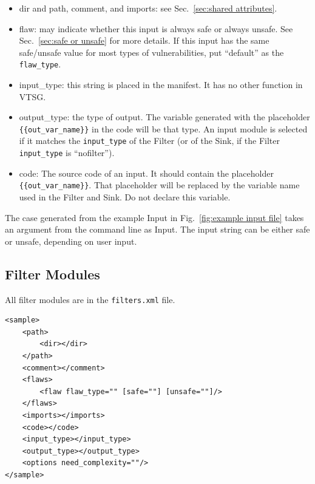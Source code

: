 \begin{itemize}
    \item dir and path, comment, and imports: see Sec.~\ref{sec:shared attributes}.

    \item flaw: may indicate whether this input is always safe or always unsafe.
      See Sec.~\ref{sec:safe or unsafe} for
      more details.  If this input has the same safe/unsafe value for most
      types of vulnerabilities, put ``default'' as the \verb|flaw_type|.

    \item input\_type: this string is placed in the manifest.  It has no other
      function in VTSG.

    \item output\_type: the type of output.  The variable generated with the
      placeholder \\ \verb|{{out_var_name}}| in the code will be that type.
      An input module is selected if it matches the \verb|input_type| of the Filter
      (or of the Sink, if the Filter \verb|input_type| is ``nofilter'').

    \item code: The source code of an input. It should contain the placeholder \\
      \verb|{{out_var_name}}|.  That placeholder will be replaced by the variable
      name used in the Filter and Sink.  Do not declare this variable.
\end{itemize}

The case generated from the example Input in 
Fig.~\ref{fig:example input file}
takes an argument from the command line as Input.  
The input string can be either safe or unsafe, depending on user input.

\subsection{Filter Modules}

All filter modules are in the \verb|filters.xml| file.

\begin{verbatim}
<sample>
    <path>
        <dir></dir>
    </path>
    <comment></comment>
    <flaws>
        <flaw flaw_type="" [safe=""] [unsafe=""]/>
    </flaws>
    <imports></imports>
    <code></code>
    <input_type></input_type>
    <output_type></output_type>
    <options need_complexity=""/>
</sample>
\end{verbatim}

